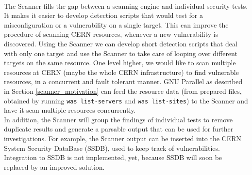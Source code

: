 \paragraph{}
The Scanner fills the gap between a scanning engine and individual security tests. It makes it easier to develop detection scripts that would test for a misconfiguration or a vulnerability on a single target. This can improve the procedure of scanning CERN resources, whenever a new vulnerability is discovered. Using the Scanner we can develop short detection scripts that deal with only one target and use the Scanner to take care of looping over different targets on the same resource. One level higher, we would like to scan multiple resources at CERN (maybe the whole CERN infrastructure) to find vulnerable resources, in a concurrent and fault tolerant manner. GNU Parallel as described in Section \ref{scanner_motivation} can feed the resource data (from prepared files, obtained by running \texttt{was list-servers} and \texttt{was list-sites}) to the Scanner and have it scan multiple resources concurrently.
\\
In addition, the Scanner will group the findings of individual tests to remove duplicate results and generate a parsable output that can be used for further investigations. For example, the Scanner output can be inserted into the CERN System Security DataBase (SSDB), used to keep track of vulnerabilities. Integration to SSDB is not implemented, yet, because SSDB will soon be replaced by an improved solution. 

